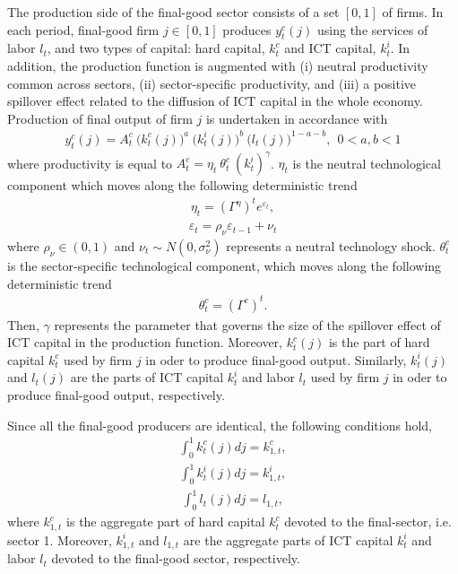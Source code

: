 \documentclass[12pt]{article}
\begin{document}
The production side of the final-good sector consists of a set $[0,1]$ of firms. In each period, final-good firm $j \in [0,1]$ produces $y^c_t(j)$ using the services of labor $l_{t}$, and two types of capital: hard capital, $k^c_{t}$ and ICT capital, $k^i_{t}$. In addition, the production function is augmented with (i) neutral productivity common across sectors, (ii) sector-specific productivity, and (iii) a positive spillover effect related to the diffusion of ICT capital in the whole economy. Production of final output of firm $j$ is undertaken in accordance with
\begin{eqnarray}\label{equation:production_FINAL}
y^c_t(j) = A^c_t \ \big( k^c_{t}(j) \big)^a \ \big( k^i_{t}(j) \big)^b \ \big( l_{t}(j) \big)^{1-a-b}, \ \ 0 < a,b < 1
\end{eqnarray}
where productivity is equal to $ A_t^c = \eta_t \ \theta^c_t \ (k^i_{t})^{\gamma} $. $\eta_t$ is the neutral technological component which moves along the following deterministic trend
\begin{eqnarray}\label{equation:neutral_tech_process}
\eta_t = (\Gamma^{\eta})^t e^{\varepsilon_t},  
\end{eqnarray} 
\begin{eqnarray}\label{equation:neutral_tech_shock}
 \varepsilon_t = \rho_{\nu} \varepsilon_{t-1} + \nu_t
\end{eqnarray} 
where $\rho_{\nu} \in (0,1)$ and $\nu_t \sim N(0,\sigma_{\nu}^2)$ represents a neutral technology shock. $\theta^c_t$ is the sector-specific technological component,  which moves along the following deterministic trend
\begin{eqnarray}
\theta_t^c = (\Gamma^{c})^t.
\end{eqnarray} 
Then, $\gamma$ represents the parameter that governs the size of the spillover effect of ICT capital in the production function. Moreover, $k^c_{t}(j)$ is the part of hard capital $k^c_t$ used by firm $j$ in oder to produce final-good output. Similarly, $k^i_{t}(j)$ and $l_{t}(j)$ are the parts of ICT capital $k^i_t$ and labor $l_t$ used by firm $j$ in oder to produce final-good output, respectively. 

Since all the final-good producers are identical, the following conditions hold,
\begin{eqnarray}\label{equation:aggregation_hard_final}
\int_0^1 k^c_{t}(j) dj = k^c_{1,t},
\end{eqnarray}
\begin{eqnarray}\label{equation:aggregation_ICT_final}
\int_0^1 k^i_{t}(j) dj = k^i_{1,t}, 
\end{eqnarray}
\begin{eqnarray}\label{equation:aggregation_labor_final}
\int_0^1 l_{t}(j) dj = l_{1,t},
\end{eqnarray}
where $k^c_{1,t}$ is the aggregate part of hard capital $k^c_t$ devoted to the final-sector, i.e. sector 1. Moreover, $k^i_{1,t}$ and $l_{1,t}$ are the aggregate parts of ICT capital $k^i_{t}$ and labor $l_{t}$ devoted to the final-good sector, respectively. 
\end{document}
